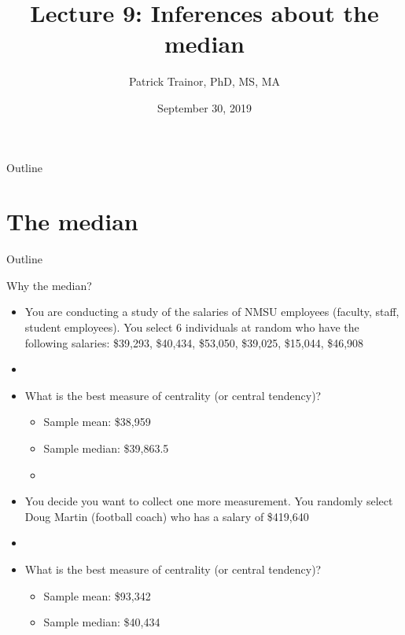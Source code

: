 \documentclass[xcolor=dvipsnames]{beamer}
\title[Lecture 9]{Lecture 9: Inferences about the median}
\author[Patrick Trainor]{Patrick Trainor, PhD, MS, MA}
\institute[NMSU]{New Mexico State University}
\date{September 30, 2019}
\begin{document}
\begin{frame}
	\maketitle
\end{frame}

\begin{frame}{Outline}
	\tableofcontents[hideallsubsections]
\end{frame}

\section{The median}
\begin{frame}{Outline}
\tableofcontents[currentsection,subsectionstyle=show/shaded/hide]
\end{frame}

\begin{frame}{Why the median?}
	\begin{itemize}
		\item You are conducting a study of the salaries of NMSU employees (faculty, staff, student employees). You select 6 individuals at random who have the following salaries: \$39,293, \$40,434, \$53,050, \$39,025, \$15,044, \$46,908 \pause
		\item[]
		\item What is the best measure of centrality (or central tendency)? \pause
		\begin{itemize}
			\item Sample mean: \$38,959 \pause
			\item Sample median: \$39,863.5 \pause
			\item[]
		\end{itemize}
	\item You decide you want to collect one more measurement. You randomly select Doug Martin (football coach) who has a salary of \$419,640 \pause
	\item[]
			\item What is the best measure of centrality (or central tendency)? \pause
	\begin{itemize}
		\item Sample mean: \$93,342 \pause
		\item Sample median: \$40,434
	\end{itemize}
	\end{itemize}
\end{frame}
\end{document}

